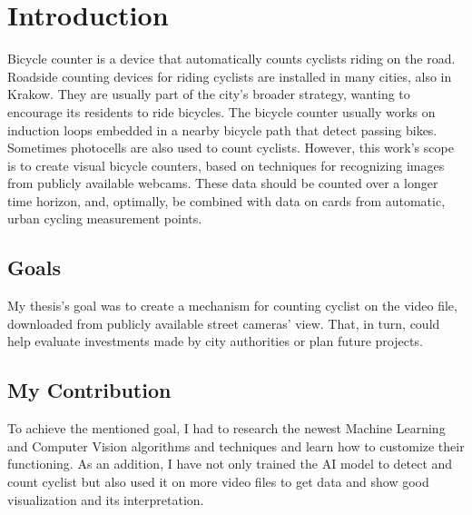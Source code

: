 \chapter{Introduction}
\label{cha:introduction}

Bicycle counter is a device that automatically counts cyclists riding on the road. Roadside counting devices for riding cyclists are installed in many cities, also in Krakow. They are usually part of the city's broader strategy, wanting to encourage its residents to ride bicycles. The bicycle counter usually works on induction loops embedded in a nearby bicycle path that detect passing bikes. Sometimes photocells are also used to count cyclists. However, this work's scope is to create visual bicycle counters, based on techniques for recognizing images from publicly available webcams. These data should be counted over a longer time horizon, and, optimally, be combined with data on cards from automatic, urban cycling measurement points.


\section{Goals}
\label{sec:goals}

My thesis's goal was to create a mechanism for counting cyclist on the video file, downloaded from publicly available street cameras' view. That, in turn, could help evaluate investments made by city authorities or plan future projects.



\section{My Contribution}
\label{sec:myContribution}

To achieve the mentioned goal, I had to research the newest Machine Learning and Computer Vision algorithms and techniques and learn how to customize their functioning. As an addition, I have not only trained the AI model to detect and count cyclist but also used it on more video files to get data and show good visualization and its interpretation.


